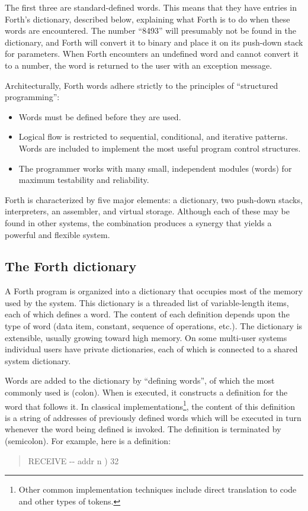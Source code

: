 \begin{quote}\ttfamily
	 \quad {} \quad \word{!} 
\end{quote}

The first three are standard-defined words. This means that they
have entries in Forth's dictionary, described below, explaining what
Forth is to do when these words are encountered. The number ``8493''
will presumably not be found in the dictionary, and Forth will
convert it to binary and place it on its push-down stack for
parameters. When Forth encounters an undefined word and cannot
convert it to a number, the word is returned to the user with an
exception message.

Architecturally, Forth words adhere strictly to the principles of
``structured programming'':

\begin{itemize}
\item Words must be defined before they are used.
\item Logical flow is restricted to sequential, conditional, and
	iterative patterns. Words are included to implement the most
	useful program control structures.
\item The programmer works with many small, independent modules
	(words) for maximum testability and reliability.
\end{itemize}

Forth is characterized by five major elements: a dictionary, two
push-down stacks, interpreters, an as\-sem\-bler, and virtual storage.
Although each of these may be found in other systems, the combination
produces a synergy that yields a powerful and flexible system.

\subsection{The Forth dictionary} %

A Forth program is organized into a dictionary that occupies most of
the memory used by the system. This dictionary is a threaded list of
variable-length items, each of which defines a word. The content of
each definition depends upon the type of word (data item, constant,
sequence of operations, etc.). The dictionary is extensible, usually
growing toward high memory. On some multi-user systems individual
users have private dictionaries, each of which is connected to a
shared system dictionary.

Words are added to the dictionary by ``defining words'', of which the
most commonly used is \word{:} (colon). When \word{:} is executed, it
constructs a definition for the word that follows it. In classical
implementations\footnote{%
Other common implementation techniques include direct translation to
code and other types of tokens.
}, the content of this definition is a string of addresses of
previously defined words which will be executed in turn whenever the
word being defined is invoked. The definition is terminated by
\word{;} (semicolon). For example, here is a definition:
\begin{quote}\ttfamily
	\word{:} RECEIVE  -{}- addr n )
		  32 
	\word{;}
\end{quote}

